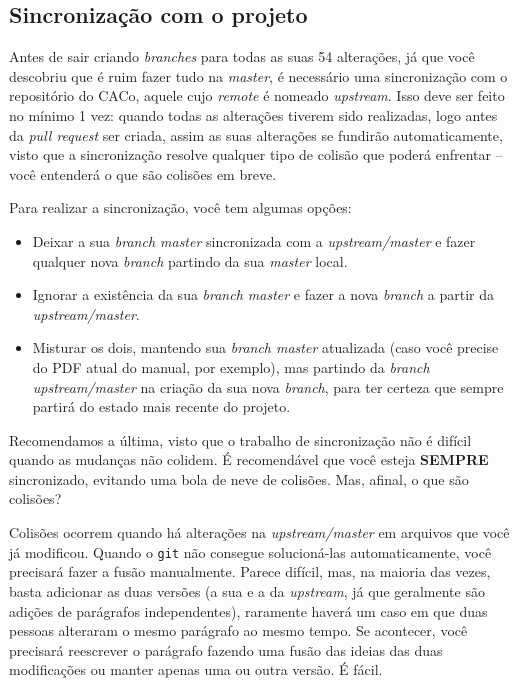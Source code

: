 \documentclass[a4paper,oneside,10pt]{memoir}
\begin{document}
\subsection{Sincronização com o projeto}

Antes de sair criando \emph{branches} para todas as suas 54 alterações, já que
você descobriu que é ruim fazer tudo na \emph{master}, é necessário uma
sincronização com o repositório do CACo, aquele cujo \emph{remote} é nomeado
\emph{upstream}. Isso deve ser feito no mínimo 1 vez: quando todas as alterações
tiverem sido realizadas, logo antes da \emph{pull request} ser criada, assim as
suas alterações se fundirão automaticamente, visto que a sincronização resolve
qualquer tipo de colisão que poderá enfrentar -- você entenderá o que são
colisões em breve.

Para realizar a sincronização, você tem algumas opções:

\begin{itemize}%
\item Deixar a sua \emph{branch master} sincronizada com a
  \emph{upstream/master} e fazer qualquer nova \emph{branch} partindo da sua
  \emph{master} local.
\item Ignorar a existência da sua \emph{branch master} e fazer a nova
  \emph{branch} a partir da \emph{upstream/master}.
\item Misturar os dois, mantendo sua \emph{branch master} atualizada (caso você
  precise do PDF atual do manual, por exemplo), mas partindo da \emph{branch
  upstream/master} na criação da sua nova \emph{branch}, para ter certeza que
  sempre partirá do estado mais recente do projeto.
\end{itemize}

Recomendamos a última, visto que o trabalho de sincronização não é difícil
quando as mudanças não colidem. É recomendável que você esteja \textbf{SEMPRE}
sincronizado, evitando uma bola de neve de colisões. Mas, afinal, o que são
colisões?

Colisões ocorrem quando há alterações na \emph{upstream/master} em arquivos que
você já modificou. Quando o \texttt{git} não consegue solucioná-las
automaticamen\-te, você precisará fazer a fusão manualmente. Parece difícil,
mas, na maioria das vezes, basta adicionar as duas versões (a sua e a da
\emph{upstream}, já que geralmente são adições de parágrafos independentes),
raramente haverá um caso em que duas pessoas alteraram o mesmo parágrafo ao
mesmo tempo. Se acontecer, você precisará reescrever o parágrafo fazendo uma
fusão das ideias das duas modificações ou manter apenas uma ou outra versão. É
fácil.
\\
\end{document}
